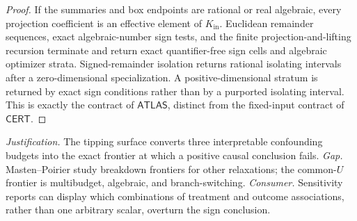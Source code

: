\documentclass{article}
\begin{document}
\begin{proof}
If the summaries and box endpoints are rational or real algebraic, every projection coefficient is an effective element of \(K_{\mathrm{in}}\).  Euclidean remainder sequences, exact algebraic-number sign tests, and the finite projection-and-lifting recursion terminate and return exact quantifier-free sign cells and algebraic optimizer strata.  Signed-remainder isolation returns rational isolating intervals after a zero-dimensional specialization.  A positive-dimensional stratum is returned by exact sign conditions rather than by a purported isolating interval.  This is exactly the contract of \(\mathsf{ATLAS}\), distinct from the fixed-input contract of \(\mathsf{CERT}\).
\end{proof}
\par\smallskip\noindent \textit{Justification.} The tipping surface converts three interpretable confounding budgets into the exact frontier at which a positive causal conclusion fails. \textit{Gap.} Masten--Poirier study breakdown frontiers for other relaxations; the common-\(U\) frontier is multibudget, algebraic, and branch-switching. \textit{Consumer.} Sensitivity reports can display which combinations of treatment and outcome associations, rather than one arbitrary scalar, overturn the sign conclusion.
\end{document}
